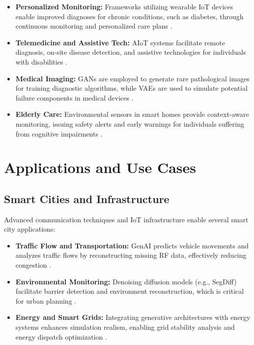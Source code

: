 \documentclass[journal]{IEEEtran}
\begin{document}
\begin{itemize}
    \item \textbf{Personalized Monitoring:} Frameworks utilizing wearable IoT devices enable improved diagnoses for chronic conditions, such as diabetes, through continuous monitoring and personalized care plans \cite{10, 22}.
    \item \textbf{Telemedicine and Assistive Tech:} AIoT systems facilitate remote diagnosis, on-site disease detection, and assistive technologies for individuals with disabilities \cite{15, 20}.
    \item \textbf{Medical Imaging:} GANs are employed to generate rare pathological images for training diagnostic algorithms, while VAEs are used to simulate potential failure components in medical devices \cite{13}.
    \item \textbf{Elderly Care:} Environmental sensors in smart homes provide context-aware monitoring, issuing safety alerts and early warnings for individuals suffering from cognitive impairments \cite{20}.
\end{itemize}
\section{Applications and Use Cases}
\subsection{Smart Cities and Infrastructure}
Advanced communication techniques and IoT infrastructure enable several smart city applications:
\begin{itemize}
    \item \textbf{Traffic Flow and Transportation:} GenAI predicts vehicle movements and analyzes traffic flows by reconstructing missing RF data, effectively reducing congestion \cite{22}.
    \item \textbf{Environmental Monitoring:} Denoising diffusion models (e.g., SegDiff) facilitate barrier detection and environment reconstruction, which is critical for urban planning \cite{22}.
    \item \textbf{Energy and Smart Grids:} Integrating generative architectures with energy systems enhances simulation realism, enabling grid stability analysis and energy dispatch optimization \cite{13, 30}.
\end{itemize}
\end{document}
